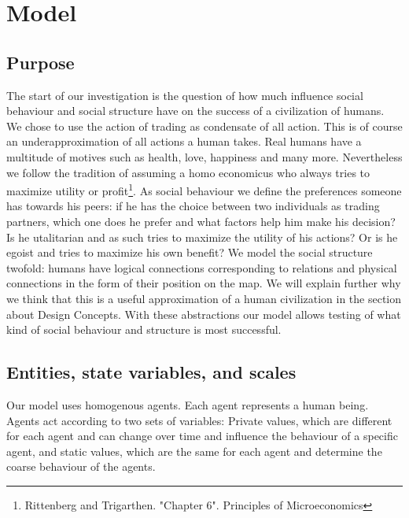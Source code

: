 \documentclass{JASSS}
\begin{document}
\section{Model}
\subsection{Purpose}
The start of our investigation is the question of how much influence social behaviour and social structure have on the success of a civilization of humans. We chose to use the action of trading as condensate of all action. This is of course an underapproximation of all actions a human takes. Real humans have a multitude of motives such as health, love, happiness and many more. Nevertheless we follow the tradition of assuming a homo economicus who always tries to maximize utility or profit\footnote{Rittenberg and Trigarthen. "Chapter 6". Principles of Microeconomics}. As social behaviour we define the preferences someone has towards his peers: if he has the choice between two individuals as trading partners, which one does he prefer and what factors help him make his decision? Is he utalitarian and as such tries to maximize the utility of his actions? Or is he egoist and tries to maximize his own benefit? We model the social structure twofold: humans have logical connections corresponding to relations and physical connections in the form of their position on the map. We will explain further why we think that this is a useful approximation of a human civilization in the section about Design Concepts. With these abstractions our model allows testing of what kind of social behaviour and structure is most successful.


\subsection{Entities, state variables, and scales}
Our model uses homogenous agents. Each agent represents a human being. Agents act according to two sets of variables: Private values, which are different for each agent and can change over time and influence the behaviour of a specific agent, and static values, which are the same for each agent and determine the coarse behaviour of the agents.\\
\end{document}
